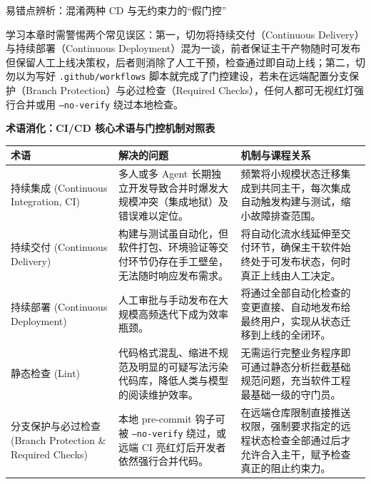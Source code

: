 \documentclass[UTF8,a4paper,11pt,fontset=fandol]{ctexart}
\begin{document}
\begin{warningbox}{易错点辨析：混淆两种 CD 与无约束力的“假门控”}

学习本章时需警惕两个常见误区：第一，切勿将持续交付（Continuous Delivery）与持续部署（Continuous Deployment）混为一谈，前者保证主干产物随时可发布但保留人工上线决策权，后者则消除了人工干预，检查通过即自动上线；第二，切勿以为写好 \texttt{.github/workflows} 脚本就完成了门控建设，若未在远端配置分支保护（Branch Protection）与必过检查（Required Checks），任何人都可无视红灯强行合并或用 \texttt{--no-verify} 绕过本地检查。

\end{warningbox}

\par{}\textbf{术语消化：CI/CD 核心术语与门控机制对照表}

\begin{center}\small\begin{tabularx}{\linewidth}{YYY}

\toprule

术语 & 解决的问题 & 机制与课程关系\\\midrule

持续集成 (Continuous Integration, CI) & 多人或多 Agent 长期独立开发导致合并时爆发大规模冲突（集成地狱）及错误难以定位。 & 频繁将小规模状态迁移集成到共同主干，每次集成自动触发构建与测试，缩小故障排查范围。\\[3pt]

持续交付 (Continuous Delivery) & 构建与测试虽自动化，但软件打包、环境验证等交付环节仍存在手工壁垒，无法随时响应发布需求。 & 将自动化流水线延伸至交付环节，确保主干软件始终处于可发布状态，何时真正上线由人工决定。\\[3pt]

持续部署 (Continuous Deployment) & 人工审批与手动发布在大规模高频迭代下成为效率瓶颈。 & 将通过全部自动化检查的变更直接、自动地发布给最终用户，实现从状态迁移到上线的全闭环。\\[3pt]

静态检查 (Lint) & 代码格式混乱、缩进不规范及明显的可疑写法污染代码库，降低人类与模型的阅读维护效率。 & 无需运行完整业务程序即可通过静态分析拦截基础规范问题，充当软件工程最基础一级的守门员。\\[3pt]

分支保护与必过检查 (Branch Protection \& Required Checks) & 本地 pre-commit 钩子可被 \texttt{--no-verify} 绕过，或远端 CI 亮红灯后开发者依然强行合并代码。 & 在远端仓库限制直接推送权限，强制要求指定的远程状态检查全部通过后才允许合入主干，赋予检查真正的阻止约束力。\\[3pt]

\bottomrule\end{tabularx}\end{center}
\end{document}
